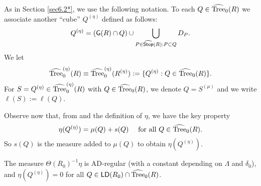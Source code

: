 As in Section \ref{sec6.2*}, we use the following notation.
To each $Q\in{\widehat{{\rm Tree}}}_0(R)$ we associate another ``cube'' $Q^{(\eta)}$ defined as follows:
$$Q^{(\eta)}= ({\mathsf{G}}(R)\cap Q)\cup \bigcup_{P\in{\widehat{{\mathsf {Stop}}}}(R):P\subset Q} D_P.$$
We let
$${\widehat{{\rm Tree}}}_0^{(\eta)}(R) \equiv {\widehat{{\rm Tree}}}_0^{(\eta)}(R^{(\eta)}):= \{Q^{(\eta)}: Q\in{\widehat{{\rm Tree}}}_0(R)\}.$$
For $S=Q^{(\eta)}\in {\widehat{{\rm Tree}}}_0^{(\eta)}(R)$ with $Q\in{\widehat{{\rm Tree}}}_0(R)$, we denote $Q=S^{(\mu)}$ and we write
$\ell(S):=\ell(Q)$.

Observe now that, from  and the definition of $\eta$, we have the key property
\begin{equation}\label{eqetq5}
\eta(Q^{(\eta)})= \mu(Q) + s(Q)\quad \mbox{ for all $Q\in{\widehat{{\rm Tree}}}_0(R)$}.
\end{equation}
So $s(Q)$ is the measure added to $\mu(Q)$ to obtain $\eta(Q^{(\eta)})$.

\vv

\begin{lemma}\label{lem9.2}
The measure $\Theta(R_0)^{-1}\eta$ is AD-regular (with a constant depending on $\Lambda$ and $\delta_0$), and 
$\eta(Q^{(\eta)})=0$ for all $Q\in{\mathsf{LD}}(R_0)\cap{\widehat{{\rm Tree}}}_0(R)$.
\end{lemma}

